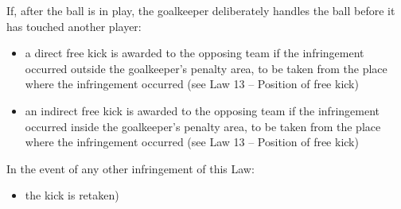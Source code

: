 {If, after the ball is in play, the goalkeeper deliberately handles the
ball before it has touched another player:

\begin{itemize}
\item a direct free kick is awarded to the opposing team if the infringement
occurred outside the goalkeeper{\textquoteright}s penalty area, to be
taken from the place where the infringement occurred (see Law 13 --
Position of free kick)
\item an indirect free kick is awarded to the opposing team if the
infringement occurred inside the goalkeeper{\textquoteright}s penalty
area, to be taken from the place where the infringement occurred (see
Law 13 -- Position of free kick)
\end{itemize}

\bigskip

In the event of any other infringement of this Law:

\begin{itemize}
\item the kick is retaken) 
\end{itemize}
}